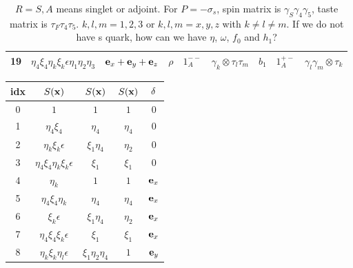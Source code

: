 \begin{table}
\begin{center}
\begin{tabular}{c|c|c|ccc|ccc}
19 & $\eta_4\xi_4\eta_k\xi_k\epsilon\eta _1\eta _2\eta _3$ & ${\bf e}_x+{\bf e}_y+{\bf e}_z$ & $\rho$ & $1^{--}_A$ & $\gamma_k\otimes\tau_l\tau_m$        & $b_1$    & $1^{+-}_A$ & $\gamma _l\gamma _m\otimes \tau _k$ \\
\hline
\end{tabular}
\end{center}
\caption{\label{tab:staggeredMeson}$R=S,A$ means singlet or adjoint. For $P=-\sigma _s$, spin matrix is $\gamma _S\gamma _4\gamma _5$, taste matrix is $\tau _F\tau _4\tau _5$. $k,l,m=1,2,3$ or $k,l,m=x,y,z$ with $k\neq l\neq m$. \textcolor[rgb]{1,0,0}{If we do not have s quark, how can we have $\eta$, $\omega$, $f_0$ and $h_1$?}}
\end{table}

\begin{table}
\begin{center}
\begin{tabular}{c|c|c|c|c}
\hline
 idx & $S({\bf x})$ & $S({\bf x})$ & $S({\bf x})$ & ${\bf \delta}$ \\
\hline
0  & $1$                                         & $1$                             & $1$            & $0$                             \\
1  & $\eta _4 \xi _4$                            & $\eta _4$                       & $\eta _4$      & $0$                             \\
2  & $\eta _k \xi _k \epsilon$                   & $\xi _1 \eta _4$                & $\eta _2$      & $0$                             \\
3  & $\eta _4 \xi _4\eta _k \xi _k \epsilon$     & $\xi _1 $                       & $\xi _1$       & $0$                             \\
4  & $\eta _k$                                   & $1$                             & $1$            & ${\bf e}_x$                     \\
5  & $\eta _4\xi _4\eta _k$                      & $\eta _4$                       & $\eta _4$      & ${\bf e}_x$                     \\
6  & $\xi _k\epsilon $                           & $\xi _1\eta_4 $                 & $\eta _2$      & ${\bf e}_x$                     \\
7  & $\eta _4\xi_4\xi_k\epsilon$                 & $\xi_1$                         & $\xi _1$       & ${\bf e}_x$                     \\
8  & $\eta _k\xi _k \eta _l \epsilon$            & $\xi _1 \eta _2 \eta _4$        & $1$            & ${\bf e}_y$                     \\

\end{tabular}
\end{center}
\end{table}
